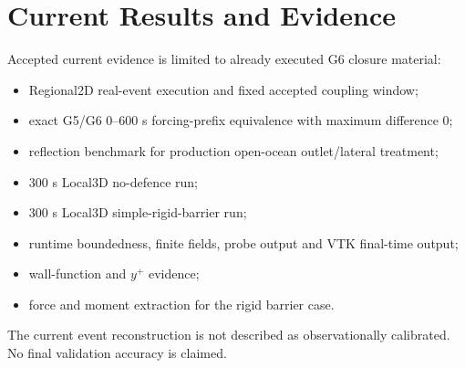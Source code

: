 \section{Current Results and Evidence}

Accepted current evidence is limited to already executed G6 closure material:

\begin{itemize}
  \item Regional2D real-event execution and fixed accepted coupling window;
  \item exact G5/G6 0--600 s forcing-prefix equivalence with maximum difference 0;
  \item reflection benchmark for production open-ocean outlet/lateral treatment;
  \item 300 s Local3D no-defence run;
  \item 300 s Local3D simple-rigid-barrier run;
  \item runtime boundedness, finite fields, probe output and VTK final-time output;
  \item wall-function and \(y^+\) evidence;
  \item force and moment extraction for the rigid barrier case.
\end{itemize}

The current event reconstruction is not described as observationally calibrated. No final validation accuracy is claimed.
